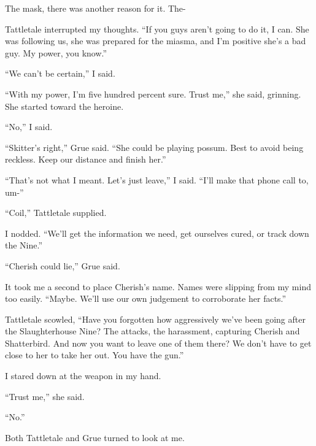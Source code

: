 The mask, there was another reason for it.  The-



Tattletale interrupted my thoughts.  ``If you guys aren't going to do it, I can.  She was following us, she was prepared for the miasma, and I'm positive she's a bad guy.  My power, you know.''



``We can't be certain,'' I said.



``With my power, I'm five hundred percent sure.  Trust me,'' she said, grinning.  She started toward the heroine.



``No,'' I said.



``Skitter's right,'' Grue said.  ``She could be playing possum.  Best to avoid being reckless.  Keep our distance and finish her.''



``That's not what I meant.  Let's just leave,'' I said.  ``I'll make that phone call to, um-''



``Coil,'' Tattletale supplied.



I nodded.  ``We'll get the information we need, get ourselves cured, or track down the Nine.''



``Cherish could lie,'' Grue said.



It took me a second to place Cherish's name.  Names were slipping from my mind too easily.  ``Maybe.  We'll use our own judgement to corroborate her facts.''



Tattletale scowled, ``Have you forgotten how aggressively we've been going after the Slaughterhouse Nine?  The attacks, the harassment, capturing Cherish and Shatterbird.  And now you want to leave one of them there?  We don't have to get close to her to take her out.  You have the gun.''



I stared down at the weapon in my hand.



``Trust me,'' she said.



``No.''



Both Tattletale and Grue turned to look at me.



